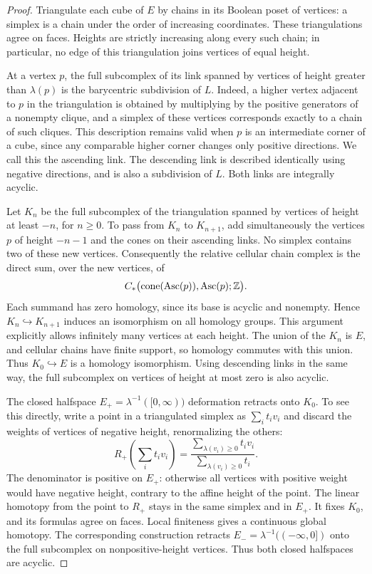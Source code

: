 \begin{proof}
Triangulate each cube of $E$ by chains in its Boolean poset of
vertices: a simplex is a chain under the order of increasing
coordinates.  These triangulations agree on faces.  Heights are
strictly increasing along every such chain; in particular, no edge
of this triangulation joins vertices of equal height.

At a vertex $p$, the full subcomplex of its link spanned by vertices
of height greater than $\lambda(p)$ is the barycentric subdivision
of $L$.  Indeed, a higher vertex adjacent to $p$ in the triangulation
is obtained by multiplying by the positive generators of a nonempty
clique, and a simplex of these vertices corresponds exactly to a
chain of such cliques.  This description remains valid when $p$ is
an intermediate corner of a cube, since any comparable higher corner
changes only positive directions.  We call this the ascending link.
The descending link is described identically using negative
directions, and is also a subdivision of $L$.  Both links are
integrally acyclic.

Let $K_n$ be the full subcomplex of the triangulation spanned by
vertices of height at least $-n$, for $n\ge0$.  To pass from $K_n$ to
$K_{n+1}$, add simultaneously the vertices $p$ of height $-n-1$ and
the cones on their ascending links.  No simplex contains two of
these new vertices.  Consequently the relative cellular chain
complex is the direct sum, over the new vertices, of
\[
 C_*\bigl(\operatorname{cone}(\operatorname{Asc}(p)),
                   \operatorname{Asc}(p);\mathbb Z\bigr).
\]
Each summand has zero homology, since its base is acyclic and
nonempty.  Hence $K_n\hookrightarrow K_{n+1}$ induces an isomorphism
on all homology groups.  This argument explicitly allows infinitely
many vertices at each height.  The union of the $K_n$ is $E$, and
cellular chains have finite support, so homology commutes with this
union.  Thus $K_0\hookrightarrow E$ is a homology isomorphism.
Using descending links in the same way, the full subcomplex on
vertices of height at most zero is also acyclic.

The closed halfspace $E_+=\lambda^{-1}([0,\infty))$ deformation
retracts onto $K_0$.  To see this directly, write a point in a
triangulated simplex as $\sum_i t_iv_i$ and discard the weights of
vertices of negative height, renormalizing the others:
\[
 R_+\left(\sum_i t_iv_i\right)
   =\frac{\sum_{\lambda(v_i)\ge0}t_iv_i}
          {\sum_{\lambda(v_i)\ge0}t_i}.
\]
The denominator is positive on $E_+$: otherwise all vertices with
positive weight would have negative height, contrary to the affine
height of the point.  The linear homotopy from the point to $R_+$
stays in the same simplex and in $E_+$.  It fixes $K_0$, and its
formulas agree on faces.  Local finiteness gives a continuous global
homotopy.  The corresponding construction retracts
$E_-=\lambda^{-1}(( -\infty,0])$ onto the full subcomplex on
nonpositive-height vertices.  Thus both closed halfspaces are
acyclic.


\end{proof}
